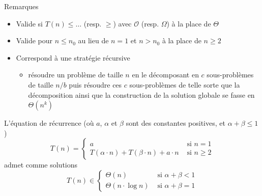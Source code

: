 \documentclass[aspectratio=1610,francais,envcountsect]{beamer}
\begin{document}
\begin{frame}[allowframebreaks]
  \framebreak
  \begin{exampleblock}{Remarques}
    \begin{itemize}
    \item Valide si $T(n) \leq \ldots$ (resp. $\geq$) avec
      $\mathcal{O}$ (resp. $\Omega$) à la place de $\Theta$
    \item Valide pour $n \leq n_0$ au lieu de $n = 1$ et $n > n_0$ à
      la place de $n \geq 2$
    \item Correspond à une stratégie récursive
      \begin{itemize}
      \item résoudre un problème de taille $n$ en le décomposant en
        $c$ sous-problèmes de taille $n/b$ puis résoudre ces $c$
        sous-problèmes de telle sorte que la décomposition ainsi que
        la construction de la solution globale se fasse en
        $\Theta(n^k)$
      \end{itemize}
    \end{itemize}
  \end{exampleblock}
  \framebreak
  
  \begin{theorem}
    \label{thm:rec4}
    L’équation de récurrence (où $a$, $\alpha$ et $\beta$ sont des
    constantes positives, et $\alpha + \beta \leq 1$)
    \begin{equation}
      \label{eq:10}
      T(n) = 
      \begin{cases}
        a & \text{ si } n = 1\\
        T(\alpha\cdot n) + T(\beta\cdot n) + a\cdot n & \text { si } n
        \geq 2
      \end{cases}
    \end{equation}
    admet comme solutions
    \begin{equation}
      T(n) \in
      \begin{cases}
        \Theta(n) & \text{ si } \alpha + \beta < 1\\
        \Theta(n\cdot\log n) & \text{ si } \alpha + \beta = 1
      \end{cases}
      \label{eq:11}
    \end{equation}

  \end{theorem}


\end{frame}
\end{document}
